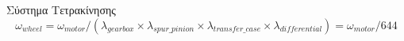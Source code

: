 \documentclass[10pt, compress, handout]{beamer} %
\begin{document}
\begin{frame}{Σύστημα Τετρακίνησης}
	\begin{equation*}
	\omega_{wheel} = \omega_{motor} / (\lambda_{gearbox} \times \lambda_{spur\_pinion} \times \lambda_{transfer\_case} \times \lambda_{differential}) = \omega_{motor} / 644
	\end{equation*}\\[-0.3cm]
	\begin{figure}
		\centering
		\\[0.15cm]
		\hspace{0.5cm}
		\hspace{0.5cm}
	\end{figure}
\end{frame}
\end{document}
